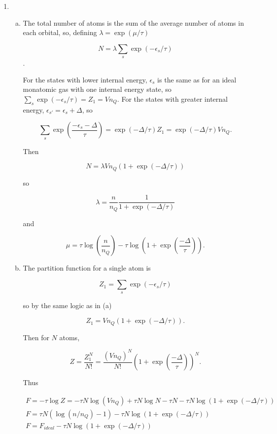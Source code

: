 \documentclass{article}
\begin{document}
\begin{enumerate}
\begin{enumerate}[(a)]
	\end{enumerate}

	\item

	\begin{enumerate}[(a)]

		\item

		The total number of atoms is the sum of the average number of atoms in each orbital, so, defining $\lambda = \exp(\mu / \tau)$

		$$N = \lambda \sum_s \exp(-\epsilon_s / \tau)$$.

		For the states with lower internal energy, $\epsilon_s$ is the same as for an ideal monatomic gas with one internal energy state, so $\sum_s \exp(-\epsilon_s / \tau) = Z_1 = V n_Q$. For the states with greater internal energy, $\epsilon_{s'} = \epsilon_s + \Delta$, so

		$$\sum_{s} \exp \left( \frac{-\epsilon_s - \Delta}{ \tau} \right) = \exp(-\Delta/\tau) Z_1 = \exp(-\Delta/\tau) Vn_Q.$$

		Then

		$$N = \lambda Vn_Q (1 + \exp(-\Delta/\tau))$$

		so

		$$\lambda = \frac{n}{n_Q} \frac{1}{1 + \exp(-\Delta/\tau)}$$

		and

		$$\mu = \tau \log \left( \frac{n}{n_Q} \right) - \tau \log \left(1 + \exp \left( \frac{-\Delta}{\tau} \right) \right).$$

		\item

		The partition function for a single atom is

		$$Z_1 = \sum_s \exp(-\epsilon_s / \tau)$$

		so by the same logic as in (a)

		$$Z_1 = Vn_Q (1 + \exp(-\Delta/\tau)).$$

		Then for $N$ atoms,

		$$Z = \frac{Z_1^N}{N!} = \frac{(Vn_Q)^N}{N!} \left(1 + \exp \left( \frac{-\Delta}{\tau} \right) \right)^N.$$

		Thus

		\begin{gather*}
		F = -\tau \log Z = -\tau N \log (V n_Q) + \tau N \log N - \tau N - \tau N \log(1 + \exp(- \Delta / \tau)) \\
		F = \tau N (\log (n / n_Q) - 1) - \tau N \log(1 + \exp(- \Delta / \tau)) \\
		F = F_{ideal} - \tau N \log(1 + \exp(- \Delta / \tau))
		\end{gather*}


\end{enumerate}
\end{enumerate}
\end{document}
